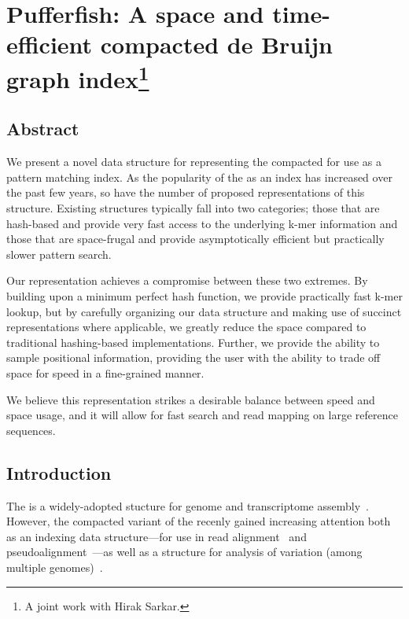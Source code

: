 \chapter{Pufferfish: A space and time-efficient compacted de Bruijn graph index\protect\footnote{A joint work with Hirak Sarkar.}}
\label{sec:pufferfish}
\section{Abstract}
  We present a novel data structure for representing the compacted \dbg for use
  as a pattern matching index. As the popularity of the \dbg as an index has
  increased over the past few years, so have the number of proposed
  representations of this structure. Existing structures typically fall into two
  categories; those that are hash-based and provide very fast access to the
  underlying k-mer information and those that are space-frugal and provide
  asymptotically efficient but practically slower pattern search.

  Our representation achieves a compromise between these two extremes. By
  building upon a minimum perfect hash function, we provide practically fast
  k-mer lookup, but by carefully organizing our data structure and making use of
  succinct representations where applicable, we greatly reduce the space
  compared to traditional hashing-based implementations. Further, we provide the
  ability to sample positional information, providing the user with the ability
  to trade off space for speed in a fine-grained manner.

  We believe this representation strikes a desirable balance between speed and
  space usage, and it will allow for fast search and read mapping on large
  reference sequences.



\section{Introduction}\label{sec:intro}

The \dbg is a widely-adopted stucture for genome and transcriptome
assembly~\cite{grabherr2011full,pevzner2001eulerian,haas2013novo}. However, the
compacted variant of the \dbg recenly gained increasing attention both as an indexing
data structure---for use in read alignment~\cite{liu2016debga} and
pseudoalignment~\cite{Bray2016Kallisto}---as well as a structure for analysis of
variation (among multiple genomes)~\cite{minkin2016twopaco}.


